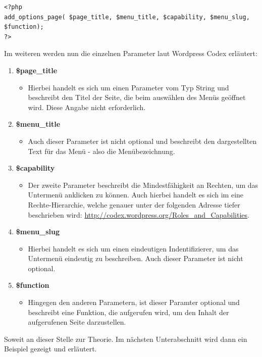 \begin{lstlisting}
<?php
add_options_page( $page_title, $menu_title, $capability, $menu_slug, $function);
?> 
\end{lstlisting}
Im weiteren werden nun die einzelnen Parameter laut Wordpress Codex erläutert:
\begin{enumerate}
	\item \textbf{\$page\_title}
	\begin{itemize}
		\item Hierbei handelt es sich um einen Parameter vom Typ String und beschreibt den Titel der Seite, die beim auswählen des Menüs geöffnet wird. Diese Angabe nicht erforderlich.
	\end{itemize}
	\item \textbf{\$menu\_title}
		\begin{itemize}
		\item Auch dieser Parameter ist nicht optional und beschreibt den dargestellten Text für das Menü - also die Menübezeichnung. 
	\end{itemize}
	\item \textbf{\$capability}
	\begin{itemize}
		\item Der zweite Parameter beschreibt die Mindestfähigkeit an Rechten, um das Untermenü anklicken zu können. Auch hierbei handelt es sich im eine Rechte-Hierarchie, welche genauer unter der folgenden Adresse tiefer beschrieben wird: \url{http://codex.wordpress.org/Roles\_and\_Capabilities}.
	\end{itemize}
	\item \textbf{\$menu\_slug}
	\begin{itemize}
		\item  Hierbei handelt es sich um einen eindeutigen Indentifizierer, um das Untermenü eindeutig zu beschreiben. Auch dieser Parameter ist nicht optional.
	\end{itemize}
	\item \textbf{\$function}
	\begin{itemize}
		\item Hingegen den anderen Parametern, ist dieser Paramter optional und beschreibt eine Funktion, die aufgerufen wird, um den Inhalt der aufgerufenen Seite darzustellen.
	\end{itemize}
\end{enumerate}
Soweit an dieser Stelle zur Theorie. Im nächsten Unterabschnitt wird dann ein Beispiel gezeigt und erläutert.
